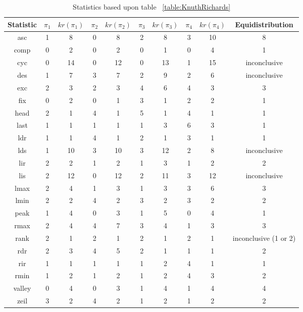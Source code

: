 \documentclass[12pt]{article}
\begin{document}
\begin{table}[H]
\caption{Statistics based upon table ~\ref{table:KnuthRichards}}
\centering
\begin{tabular}{c | c c c c c c c c | c}
\hline\hline
Statistic & $\pi_1$ & $kr(\pi_1)$ & $\pi_2$ & $kr(\pi_2)$ & $\pi_3$ & $kr(\pi_3)$ & $\pi_4$ & $kr(\pi_4)$ & Equidistribution\\ [0.5ex]
\hline
asc & 1 & 8 & 0 & 8 & 2 & 8 & 3 & 10 & 8\\ 
comp & 0 & 2 & 0 & 2 & 0 & 1 & 0 & 4 & 1\\
cyc & 0 & 14 & 0 & 12 & 0 & 13 & 1 & 15 & inconclusive\\
des & 1 & 7 & 3 & 7 & 2 & 9 & 2 & 6 & inconclusive\\
exc & 2 & 3 & 2 & 3 & 4 & 6 & 4 & 3 & 3\\
fix & 0 & 2 & 0 & 1 & 3 & 1 & 2 & 2 & 1\\
head & 2 & 1 & 4 & 1 & 5 & 1 & 4 & 1 & 1\\
last & 1 & 1 & 1 & 1 & 1 & 3 & 6 & 3 & 1\\ 
ldr & 1 & 1 & 4 & 1 & 2 & 1 & 3 & 1 & 1\\
lds & 1 & 10 & 3 & 10 & 3 & 12 & 2 & 8 & inconclusive\\
lir & 2 & 2 & 1 & 2 & 1 & 3 & 1 & 2 & 2\\
lis & 2 & 12 & 0 & 12 & 2 & 11 & 3 & 12 & inconclusive\\
lmax & 2 & 4 & 1 & 3 & 1 & 3 & 3 & 6 & 3\\
lmin & 2 & 2 & 4 & 2 & 3 & 2 & 3 & 2 & 2\\
peak & 1 & 4 & 0 & 3 & 1 & 5 & 0 & 4 & 1\\
rmax & 2 & 4 & 4 & 7 & 3 & 4 & 1 & 3 & 3\\
rank & 2 & 1 & 2 & 1 & 2 & 1 & 2 & 1 & inconclusive (1 or 2)\\
rdr & 2 & 3 & 4 & 5 & 2 & 1 & 1 & 1 & 2\\
rir & 1 & 1 & 1 & 1 & 1 & 2 & 4 & 1 & 1\\
rmin & 1 & 2 & 1 & 2 & 1 & 2 & 4 & 3 & 2\\
valley & 0 & 4 & 0 & 3 & 1 & 4 & 1 & 4 & 4\\
zeil & 3 & 2 & 4 & 2 & 1 & 2 & 1 & 2 & 2\\
\hline
\end{tabular}
\label{table:KnuthRichardsPerms}
\end{table}
\end{document}
